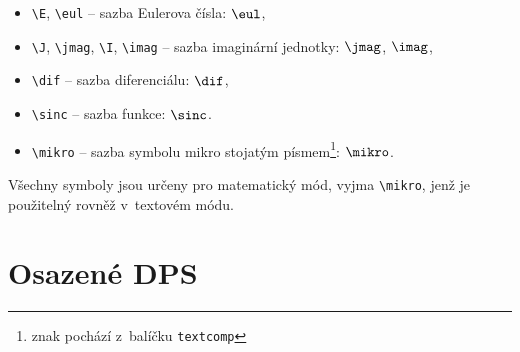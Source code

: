 \begin{itemize}
  \item
    \verb|\E|, \verb|\eul| -- sazba Eulerova čísla: $\eul$,
  \item
    \verb|\J|, \verb|\jmag|, \verb|\I|, \verb|\imag| -- sazba imaginární jednotky: $\jmag$, $\imag$,
  \item
    \verb|\dif| -- sazba diferenciálu: $\dif$,
  \item
    \verb|\sinc| -- sazba funkce: $\sinc$.
  \item
    \verb|\mikro| -- sazba symbolu mikro stojatým písmem\footnote{znak pochází z~balíčku \texttt{textcomp}}: $\mikro$.

\end{itemize}
%
Všechny symboly jsou určeny pro matematický mód, vyjma \verb|\mikro|, jenž je použitelný rovněž v~textovém módu.






\chapter{Osazené DPS}\label{priloha:B}


